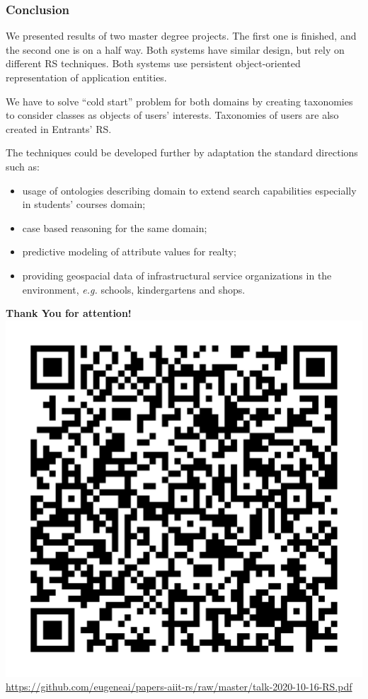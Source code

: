 \documentclass[10pt,dvipsnames]{beamer}
\begin{document}
\begin{frame}
  \frametitle{Conclusion}
  We presented results of two master degree projects.  The first one is finished, and the second one is on a half way.  Both systems have similar design, but rely on different RS techniques. Both systems use persistent object-oriented representation of application entities.

We have to solve ``cold start'' problem for both domains by creating taxonomies to consider classes as objects of users' interests.  Taxonomies of users are also created in Entrants' RS.

The techniques could be developed further by adaptation the standard directions such as:
\begin{itemize}
  \item usage of ontologies describing domain to extend search capabilities especially in students' courses domain;
  \item case based reasoning for the same domain;
  \item predictive modeling of attribute values for realty;
  \item providing geospacial data of infrastructural service organizations in the environment, \emph{e.g.} schools, kindergartens and shops.
\end{itemize}
\end{frame}


\begin{frame}{}
  \vfill
  \centering
  \Huge \textbf{Thank You for attention!}
  \vfill
  \includegraphics[width=0.5\linewidth]{QRURL.png}\\
  \normalsize\url{https://github.com/eugeneai/papers-aiit-rs/raw/master/talk-2020-10-16-RS.pdf}
\end{frame}
\end{document}
